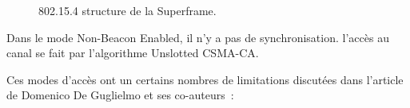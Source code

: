     \begin{figure}[H]
        \centering
        \caption{802.15.4 structure de la Superframe.}
        \label{fig:etat_art-802.15.4.superframe}
    \end{figure}

    Dans le mode Non-Beacon Enabled, il n'y a pas de synchronisation. l'accès au canal se fait par l'algorithme Unslotted CSMA-CA.\par


    Ces modes d'accès ont un certains nombres de limitations discutées dans l'article de Domenico De Guglielmo et ses co-auteurs~\cite{paper:802.15.4e-survey}:
    
